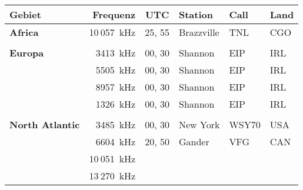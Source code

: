\vspace{1em}
\begin{tabular}{lrclll}
\bfseries Gebiet & \bfseries Frequenz & \bfseries UTC & \bfseries Station & \bfseries Call & \bfseries Land \\ \toprule \arrayrulecolor{rowsep}
\textbf{Africa} & 10 057 kHz & 25, 55 & Brazzville & TNL & CGO \\ \midrule
 &  &  &  &  &  \\ 
\textbf{Europa} & 3413 kHz & 00, 30 & Shannon & EIP & IRL \\ \midrule
 & 5505 kHz & 00, 30 & Shannon & EIP & IRL \\ \midrule
 & 8957 kHz & 00, 30 & Shannon & EIP & IRL \\ \midrule
 & 1326 kHz & 00, 30 & Shannon & EIP & IRL \\ \midrule
 &  &  &  &  &  \\ 
\textbf{North Atlantic} & 3485 kHz & 00, 30 & New York & WSY70 & USA \\ \midrule
 & 6604 kHz & 20, 50 & Gander & VFG & CAN \\ \midrule
 & 10 051 kHz &  &  &  &  \\ \midrule
 & 13 270 kHz &  &  &  &  \\ \midrule
\end{tabular}










